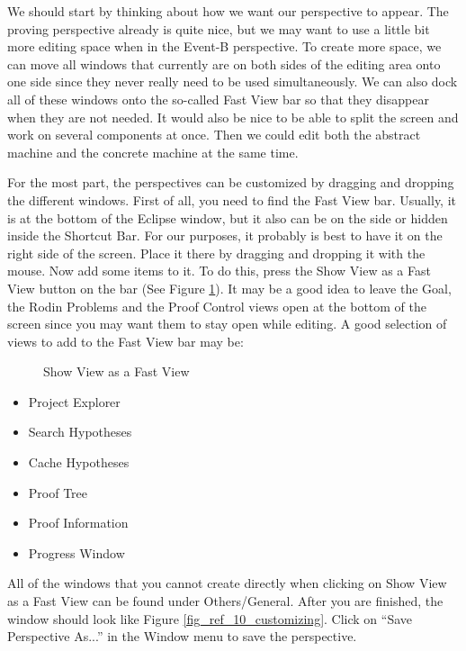 We should start by thinking about how we want our perspective to appear. The proving perspective already is quite nice, but we may want to use a little bit more editing space when in the Event-B perspective. To create more space, we can move all windows that currently are on both sides of the editing area onto one side since they never really need to be used simultaneously. We can also dock all of these windows onto the so-called Fast View bar so that they disappear when they are not needed. It would also be nice to be able to split the screen and work on several components at once. Then we could edit both the abstract machine and the concrete machine at the same time.

For the most part, the perspectives can be customized by dragging and dropping the different windows. First of all, you need to find the Fast View bar. Usually, it is at the bottom of the Eclipse window, but it also can be on the side or hidden inside the Shortcut Bar. For our purposes, it probably is best to have it on the right side of the screen. Place it there by dragging and dropping it with the mouse. Now add some items to it. To do this, press the \textsf{Show View as a Fast View} button on the bar (See Figure \ref{fig_ref_01_customizing2}). It may be a good idea to leave the Goal, the Rodin Problems and the Proof Control views open at the bottom of the screen since you may want them to stay open while editing. A good selection of views to add to the Fast View bar may be:

\begin{figure}[!ht]
\begin{center}
	\caption{Show View as a Fast View}
	\label{fig_ref_01_customizing2}
\end{center}
\end{figure}

\begin{itemize}
	\item Project Explorer	
	\item Search Hypotheses
	\item Cache Hypotheses
	\item Proof Tree
	\item Proof Information
	\item Progress Window
\end{itemize}

All of the windows that you cannot create directly when clicking on \textsf{Show View as a Fast View} can be found under \textsf{Others/General}. After you are finished, the window should look like Figure \ref{fig_ref_10_customizing}. Click on ``Save Perspective As...'' in the Window menu to save the perspective.

